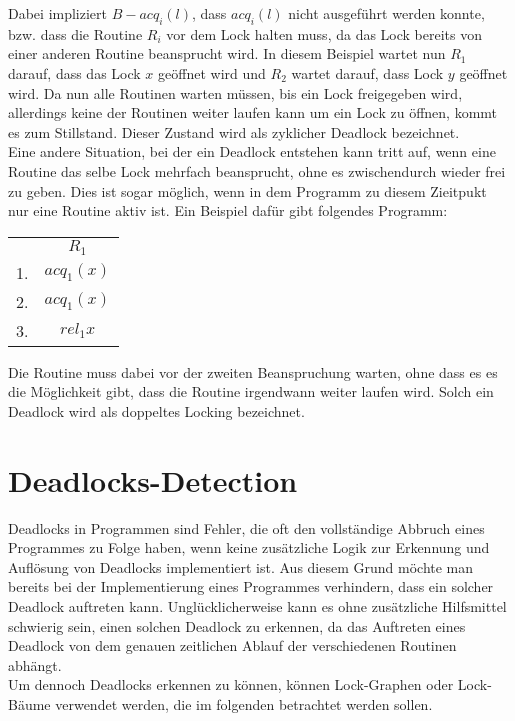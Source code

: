 Dabei impliziert $B-acq_i(l)$, dass $acq_{i}(l)$ nicht ausgeführt werden konnte,
bzw. dass die Routine $R_i$ vor dem Lock halten muss, da das Lock bereits von 
einer anderen Routine beansprucht wird. In diesem Beispiel wartet nun $R_1$ 
darauf, dass das Lock $x$ geöffnet wird und $R_2$ wartet darauf, dass Lock 
$y$ geöffnet wird. Da nun alle Routinen warten müssen, bis ein Lock freigegeben 
wird, allerdings keine der Routinen weiter laufen kann um ein Lock zu öffnen, 
kommt es zum Stillstand. Dieser Zustand wird als zyklicher Deadlock bezeichnet.\\
Eine andere Situation, bei der ein Deadlock entstehen kann tritt auf, wenn 
eine Routine das selbe Lock mehrfach beansprucht, ohne es zwischendurch wieder 
frei zu geben. Dies ist sogar möglich, wenn in dem Programm zu diesem Zieitpukt
nur eine Routine aktiv ist. Ein Beispiel dafür gibt folgendes Programm:
\begin{table}[H]
    \centering
    \begin{tabular}{cc}
        & $R_1$ \\
        1. & $acq_{1}(x)$ \\
        2. & $acq_1(x)$\\
        3. & $rel_1{x}$
    \end{tabular}
\end{table}
Die Routine muss dabei vor der zweiten Beanspruchung warten,
ohne dass es es die Möglichkeit gibt, dass die Routine irgendwann weiter laufen wird.
Solch ein Deadlock wird als doppeltes Locking bezeichnet.\\
\section{Deadlocks-Detection}
Deadlocks in Programmen sind Fehler, die oft den vollständige Abbruch eines 
Programmes zu Folge haben, wenn keine zusätzliche Logik zur Erkennung und Auflösung von 
Deadlocks implementiert ist. Aus diesem Grund möchte man bereits bei der 
Implementierung eines Programmes verhindern, dass ein solcher Deadlock auftreten 
kann. Unglücklicherweise kann es ohne zusätzliche Hilfsmittel schwierig sein, 
einen solchen Deadlock zu erkennen, da das Auftreten eines Deadlock von dem 
genauen zeitlichen Ablauf der verschiedenen Routinen abhängt.\\
Um dennoch Deadlocks 
erkennen zu können, können Lock-Graphen oder Lock-Bäume verwendet werden, die 
im folgenden betrachtet werden sollen.
